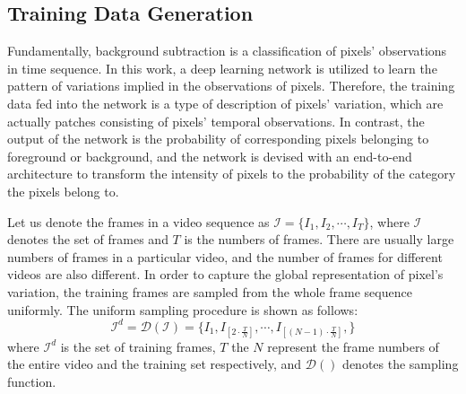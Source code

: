 \documentclass[journal]{IEEEtran}
\begin{document}
\subsection*{Training Data Generation}
Fundamentally, 
background subtraction is a classification of pixels' observations in time sequence.
In this work,
a deep learning network is utilized to learn the pattern of variations implied in the observations of pixels.
Therefore,
the training data fed into the network is a type of description of pixels' variation,
which are actually patches consisting of pixels' temporal observations.
%
In contrast, the output of the network is the probability of corresponding pixels belonging to foreground or background,
and the network is devised with an end-to-end architecture to transform the intensity of pixels to the probability of the category the pixels belong to.

Let us denote the frames in a video sequence as $\mathcal{I} = \{I_1, I_2, \cdots, I_T\}$,
where $\mathcal{I}$ denotes the set of frames and $T$ is the numbers of frames.
%
There are usually large numbers of frames in a particular video,
and the number of frames for different videos are also different.
%
In order to capture the global representation of pixel's variation,
the training frames are sampled from the whole frame sequence uniformly.
%
%
The uniform sampling procedure is shown as follows:
% 
% 
\begin{equation}
    \mathcal{I}^d = \mathcal{D}(\mathcal{I})=  \{I_1, I_{[2 \cdot \frac{T}{N}]}, \cdots, I_{[(N - 1) \cdot \frac{T}{N}]}, \}
\end{equation}
where $\mathcal{I}^d$ is the set of training frames,
$T$ the $N$ represent the frame numbers of the entire video and the training set respectively,
and $\mathcal{D}()$ denotes the sampling function.
% 
% 
% 
% 
% 
\end{document}
